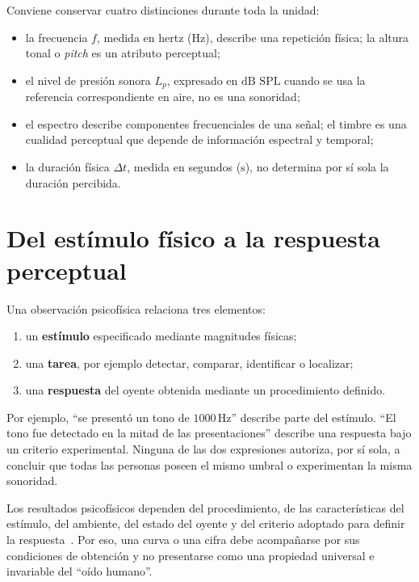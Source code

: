 Conviene conservar cuatro distinciones durante toda la unidad:

\begin{itemize}
    \item la frecuencia \(f\), medida en hertz (\(\text{Hz}\)), describe una
    repetición física; la altura tonal o \emph{pitch} es un atributo
    perceptual;
    \item el nivel de presión sonora \(L_p\), expresado en
    \(\text{dB SPL}\) cuando se usa la referencia correspondiente en aire, no
    es una sonoridad;
    \item el espectro describe componentes frecuenciales de una señal; el
    timbre es una cualidad perceptual que depende de información espectral y
    temporal;
    \item la duración física \(\Delta t\), medida en segundos
    (\(\text{s}\)), no determina por sí sola la duración percibida.
\end{itemize}

\section{Del estímulo físico a la respuesta perceptual}
\label{sec:u7-fisico-perceptual}

Una observación psicofísica relaciona tres elementos:

\begin{enumerate}
    \item un \textbf{estímulo} especificado mediante magnitudes físicas;
    \item una \textbf{tarea}, por ejemplo detectar, comparar, identificar o
    localizar;
    \item una \textbf{respuesta} del oyente obtenida mediante un procedimiento
    definido.
\end{enumerate}

Por ejemplo, ``se presentó un tono de \(1000\,\text{Hz}\)'' describe parte del
estímulo. ``El tono fue detectado en la mitad de las presentaciones'' describe
una respuesta bajo un criterio experimental. Ninguna de las dos expresiones
autoriza, por sí sola, a concluir que todas las personas poseen el mismo
umbral o experimentan la misma sonoridad.

Los resultados psicofísicos dependen del procedimiento, de las
características del estímulo, del ambiente, del estado del oyente y del
criterio adoptado para definir la respuesta~\cite{oxenham2018}. Por eso, una curva o una cifra
debe acompañarse por sus condiciones de obtención y no presentarse como una
propiedad universal e invariable del ``oído humano''.

